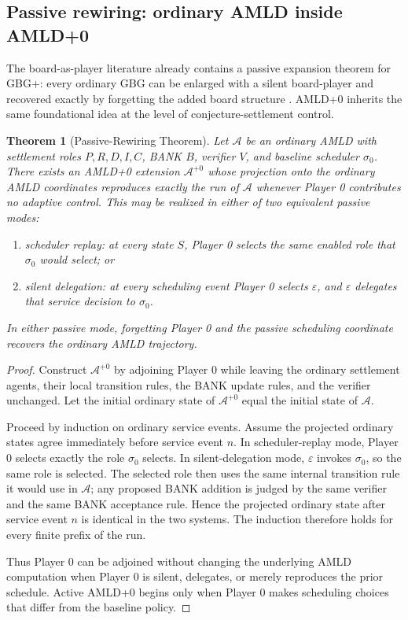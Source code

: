 \documentclass[11pt]{article}
\newtheorem{theorem}[definition]{Theorem}
\begin{document}
\subsection{Passive rewiring: ordinary AMLD inside AMLD+0}

The board-as-player literature already contains a passive expansion theorem for GBG+: every ordinary GBG can be enlarged with a silent board-player and recovered exactly by forgetting the added board structure \cite{gbgplus}. AMLD+0 inherits the same foundational idea at the level of conjecture-settlement control.

\begin{theorem}[Passive-Rewiring Theorem]
Let $\mathcal A$ be an ordinary AMLD with settlement roles $P,R,D,I,C$, BANK $B$, verifier $V$, and baseline scheduler $\sigma_0$. There exists an AMLD+0 extension $\mathcal A^{+0}$ whose projection onto the ordinary AMLD coordinates reproduces exactly the run of $\mathcal A$ whenever Player 0 contributes no adaptive control. This may be realized in either of two equivalent passive modes:
\begin{enumerate}
    \item \emph{scheduler replay}: at every state $S$, Player 0 selects the same enabled role that $\sigma_0$ would select; or
    \item \emph{silent delegation}: at every scheduling event Player 0 selects $\varepsilon$, and $\varepsilon$ delegates that service decision to $\sigma_0$.
\end{enumerate}
In either passive mode, forgetting Player 0 and the passive scheduling coordinate recovers the ordinary AMLD trajectory.
\end{theorem}

\begin{proof}
Construct $\mathcal A^{+0}$ by adjoining Player 0 while leaving the ordinary settlement agents, their local transition rules, the BANK update rules, and the verifier unchanged. Let the initial ordinary state of $\mathcal A^{+0}$ equal the initial state of $\mathcal A$.

Proceed by induction on ordinary service events. Assume the projected ordinary states agree immediately before service event $n$. In scheduler-replay mode, Player 0 selects exactly the role $\sigma_0$ selects. In silent-delegation mode, $\varepsilon$ invokes $\sigma_0$, so the same role is selected. The selected role then uses the same internal transition rule it would use in $\mathcal A$; any proposed BANK addition is judged by the same verifier and the same BANK acceptance rule. Hence the projected ordinary state after service event $n$ is identical in the two systems. The induction therefore holds for every finite prefix of the run.

Thus Player 0 can be adjoined without changing the underlying AMLD computation when Player 0 is silent, delegates, or merely reproduces the prior schedule. Active AMLD+0 begins only when Player 0 makes scheduling choices that differ from the baseline policy.
\end{proof}
\end{document}
